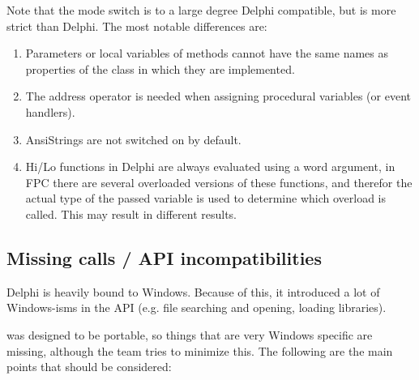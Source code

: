 Note that the  mode switch is to a large degree Delphi
compatible, but is more strict than Delphi. The most notable differences
are:
\begin{enumerate}
\item Parameters or local variables of methods cannot have the same
names as properties of the class in which they are implemented.
\item The address operator is needed when assigning procedural variables (or event handlers).
\item AnsiStrings are not switched on by default.
\item Hi/Lo functions in Delphi are always evaluated using a word argument,
in FPC there are several overloaded versions of these functions, and
therefor the actual type of the passed variable is used to determine which
overload is called. This may result in different results.
\end{enumerate}

\subsection{Missing calls / API incompatibilities}
Delphi is heavily bound to Windows. Because of this, it introduced a lot of
Windows-isms in the API (e.g. file searching and opening, loading libraries).

\fpc was designed to be portable, so things that are very Windows
specific are missing, although the \fpc team tries to minimize this.
The following are the main points that should be considered:


